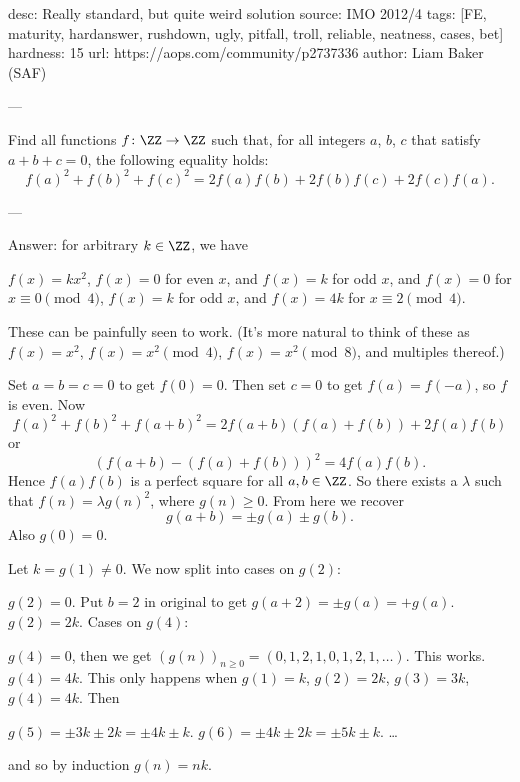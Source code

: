 desc:  Really standard, but quite weird solution
source:  IMO 2012/4
tags:  [FE, maturity, hardanswer, rushdown, ugly, pitfall, troll, reliable, neatness, cases, bet]
hardness: 15
url: https://aops.com/community/p2737336
author: Liam Baker (SAF)

---

Find all functions $f \colon \ZZ \to \ZZ$ such that,
for all integers $a$, $b$, $c$ that satisfy $a+b+c=0$,
the following equality holds:
\[ f(a)^2+f(b)^2+f(c)^2 = 2f(a)f(b)+2f(b)f(c)+2f(c)f(a). \]

---

Answer: for arbitrary $k \in \ZZ$, we have
\begin{enumerate}[(i)]
  \ii $f(x) = kx^2$,
  \ii $f(x) = 0$ for even $x$, and $f(x) = k$ for odd $x$, and
  \ii $f(x) = 0$ for $x \equiv 0 \pmod 4$,
  $f(x) = k$ for odd $x$, and $f(x) = 4k$ for $x \equiv 2 \pmod 4$.
\end{enumerate}
These can be painfully seen to work.
(It's more natural to think of these as
$f(x) = x^2$, $f(x) = x^2 \pmod 4$, $f(x) = x^2 \pmod 8$,
and multiples thereof.)

Set $a=b=c=0$ to get $f(0)=0$.
Then set $c=0$ to get $f(a) = f(-a)$, so $f$ is even.
Now \[ f(a)^2 + f(b)^2 + f(a+b)^2
= 2f(a+b)\left( f(a)+f(b) \right) + 2f(a)f(b) \]
or
\[ \left( f(a+b) - \left( f(a)+f(b) \right) \right)^2
  = 4f(a)f(b). \]
Hence $f(a)f(b)$ is a perfect square for all $a,b \in \ZZ$.
So there exists a $\lambda$ such that $f(n) = \lambda g(n)^2$, where $g(n) \ge 0$.
From here we recover
\[ \boxed{g(a+b) = \pm g(a) \pm g(b)}. \]
Also $g(0) = 0$.

Let $k = g(1) \neq 0$.
We now split into cases on $g(2)$:
\begin{itemize}
  \ii $g(2) = 0$. Put $b = 2$ in original to get
  $g(a+2) = \pm g(a) = +g(a)$.
  \ii $g(2) = 2k$. Cases on $g(4)$:
  \begin{itemize}
    \ii $g(4) = 0$, then we get
    $(g(n))_{n\ge0} = (0,1,2,1,0,1,2,1,\dots)$.  This works.
    \ii $g(4) = 4k$. This only happens when
    $g(1) = k$, $g(2) = 2k$, $g(3) = 3k$, $g(4) = 4k$.
    Then
    \begin{itemize}
      \ii $g(5) = \pm 3k \pm 2k = \pm 4k \pm k$.
      \ii $g(6) = \pm4k \pm 2k = \pm5k \pm k$.
      \ii \dots
    \end{itemize}
    and so by induction $g(n) = nk$.
  \end{itemize}
\end{itemize}

